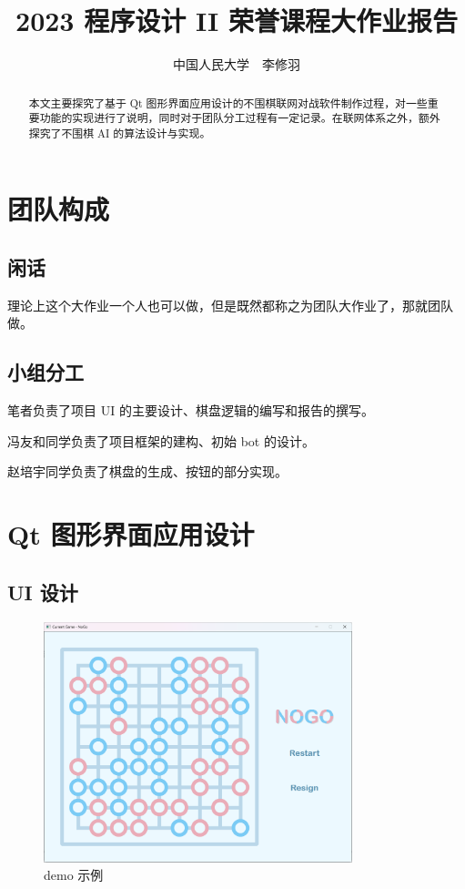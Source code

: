 \documentclass{noithesis}
\begin{document}
	
	\title{2023 程序设计 II 荣誉课程大作业报告}
	\author{中国人民大学~~李修羽}
	
	\maketitle
	
	\begin{abstract}
		本文主要探究了基于 Qt 图形界面应用设计的不围棋联网对战软件制作过程，对一些重要功能的实现进行了说明，同时对于团队分工过程有一定记录。在联网体系之外，额外探究了不围棋 AI 的算法设计与实现。
	\end{abstract}

	\tableofcontents
	\setcounter{page}{0}
	\thispagestyle{empty}
	\newpage
	
	\section{团队构成}
	
	\subsection{闲话}
	
	理论上这个大作业一个人也可以做，但是既然都称之为团队大作业了，那就团队做。
	
	\subsection{小组分工}
	
	笔者负责了项目 UI 的主要设计、棋盘逻辑的编写和报告的撰写。
	
	冯友和同学负责了项目框架的建构、初始 bot 的设计。
	
	赵培宇同学负责了棋盘的生成、按钮的部分实现。
	
	\section{Qt 图形界面应用设计}
	
	
	\subsection{UI 设计}
	
	\begin{figure}[!htb]{
		\centering
		\includegraphics[width=0.8\textwidth]{img/UI.png}
		\caption{demo 示例}
	}
	\end{figure}
\end{document}
